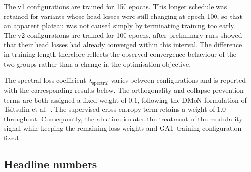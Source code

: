 The v1 configurations are trained for 150 epochs.
This longer schedule was retained for variants whose head losses
were still changing at epoch 100,
so that an apparent plateau was not caused simply by terminating
training too early.
The v2 configurations are trained for 100 epochs,
after preliminary runs showed that their head losses had already
converged within this interval.
The difference in training length therefore reflects the observed
convergence behaviour of the two groups
rather than a change in the optimisation objective.

The spectral-loss coefficient $\lambda_{\text{spectral}}$ varies
between configurations and is reported with the corresponding results
below.
The orthogonality and collapse-prevention terms are both assigned
a fixed weight of $0.1$,
following the DMoN formulation of Tsitsulin et al.~\cite{tsitsulin2023dmon}.
The supervised cross-entropy term retains a weight of $1.0$ throughout.
Consequently, the ablation isolates the treatment of the modularity
signal
while keeping the remaining loss weights and GAT training configuration
fixed.

\subsection{Headline numbers}
\label{sec_res_sadmon_numbers}

